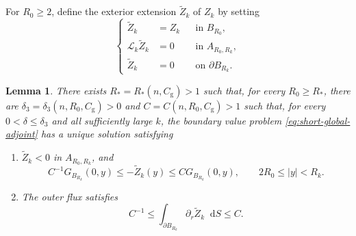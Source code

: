 \documentclass[11pt]{article}
\numberwithin{equation}{section}
\newtheorem{lemma}[theorem]{Lemma}
\theoremstyle{remark}
\newcommand{\dd}{\mathop{}\!\mathrm{d}}
\begin{document}
For $R_0\ge2$, define the exterior extension
$\widetilde Z_k$ of $Z_k$ by setting
{
\begin{equation}\label{eq:short-global-adjoint}
 {\left\{\begin{aligned}
  \widetilde Z_k&=Z_k&&\text{in }B_{R_0},\\
  \mathcal L_k\widetilde Z_k&=0&&\text{in }A_{R_0,R_k},\\
  \widetilde Z_k&=0&&\text{on }\partial B_{R_k}.
 \end{aligned}\right.}
\end{equation}
}
 \begin{lemma} \label{lem:exterior-corrected-adjoint}
There exists $R_*=R_*(n,C_{\mathrm g})>1$ such that,
for every $R_0\ge R_*$, there are
$\delta_3=\delta_3(n,R_0,C_{\mathrm g})>0$ and
$C=C(n,R_0,C_{\mathrm g})>1$ such that, for every
$0<\delta\le\delta_3$ and all sufficiently large $k$, the boundary value
problem  \eqref{eq:short-global-adjoint} has a unique solution satisfying
\begin{enumerate}
\item[\emph{(i)}]
$\widetilde Z_k<0$ in $A_{R_0,R_k}$, and
{
\[
 C^{-1}G_{B_{R_k}}(0,y)\le-\widetilde Z_k(y)
 \le CG_{B_{R_k}}(0,y),\qquad 2R_0\le |y|<R_k.
\]
}
 \item[\emph{(ii)}]
The outer flux satisfies
{
\[
 C^{-1}\le\int_{\partial B_{R_k}}
 \partial_r\widetilde Z_k\dd S\le C.
\]
}
\end{enumerate}
\end{lemma}
\end{document}
